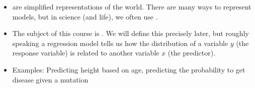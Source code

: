 \begin{itemize}
\item {} are simplified representations of the world.
There are many ways to represent models, but in science (and life), we often use . 
\item The subject of this course is . We will define this precisely  later, but roughly speaking a regression model tells us how the distribution of a variable $y$ (the response variable) is related to another variable $x$ (the predictor). 
\item Examples: Predicting height based on age, predicting the probability to get disease given a mutation
\end{itemize}
%
%
%
%
